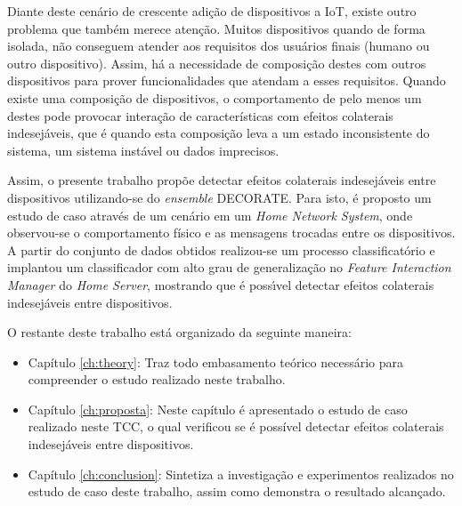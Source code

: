 Diante deste cenário de crescente adição de dispositivos a IoT, existe outro problema que também merece atenção. Muitos dispositivos quando de forma isolada, não conseguem atender aos requisitos dos usuários finais (humano ou outro dispositivo). Assim, há a necessidade de composição destes com outros dispositivos para prover funcionalidades que atendam a esses requisitos. Quando existe uma composição de dispositivos, o comportamento de pelo menos um destes pode provocar interação de características com efeitos colaterais indesejáveis, que é quando esta composição leva a um estado inconsistente do sistema, um sistema instável ou dados imprecisos. 

Assim, o presente trabalho propõe detectar efeitos colaterais indesejáveis entre dispositivos utilizando-se do \textit{ensemble} DECORATE. Para isto, é proposto um estudo de caso através de um cenário em um \textit{Home Network System}, onde observou-se o comportamento físico e as mensagens trocadas entre os dispositivos. A partir do conjunto de dados obtidos realizou-se um processo classificatório e implantou um classificador com alto grau de generalização no \textit{Feature Interaction Manager} do \textit{Home Server}, mostrando que é possı́vel detectar efeitos colaterais indesejáveis entre dispositivos.

O restante deste trabalho está organizado da seguinte maneira:

\begin{itemize}
\item Capítulo \ref{ch:theory}: Traz todo embasamento teórico necessário para compreender o estudo realizado neste trabalho.
\item Capítulo \ref{ch:proposta}: Neste capítulo é apresentado o estudo de caso realizado neste TCC, o qual verificou se é possível detectar efeitos colaterais indesejáveis entre dispositivos. 
\item Capítulo \ref{ch:conclusion}: Sintetiza a investigação e experimentos realizados no estudo de caso deste trabalho, assim como demonstra o resultado alcançado.
\end{itemize}
